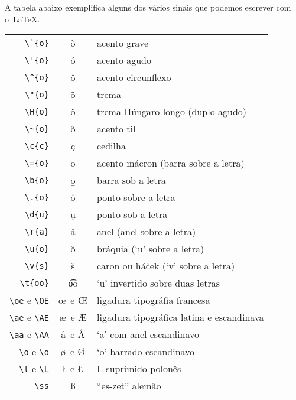 \documentclass[article,openany]{memoir}
\newenvironment{exemplo}{\begin{center}}{\end{center}}
\begin{document}
A tabela abaixo exemplifica alguns dos vários sinais que podemos
escrever com o~\LaTeX.
\begin{exemplo}
\begin{tabular}{rcl}
 \verb/\`{o}/ & \`{o} & acento grave                                   \\
 \verb/\'{o}/ & \'{o} & acento agudo                                   \\
 \verb/\^{o}/ & \^{o} & acento circunflexo                             \\
 \verb/\"{o}/ & \"{o} & trema                                          \\
 \verb/\H{o}/ & \H{o} & trema Húngaro longo (duplo agudo)              \\
 \verb/\~{o}/ & \~{o} & acento til                                     \\
 \verb/\c{c}/ & \c{c} & cedilha                                        \\
 \verb/\={o}/ & \={o} & acento mácron (barra sobre a letra)            \\
 \verb/\b{o}/ & \b{o} & barra sob a letra                              \\
 \verb/\.{o}/ & \.{o} & ponto sobre a letra                            \\
 \verb/\d{u}/ & \d{u} & ponto sob a letra                              \\
 \verb/\r{a}/ & \r{a} & anel (anel sobre a letra)                      \\
 \verb/\u{o}/ & \u{o} & bráquia (`u' sobre a letra)                    \\
 \verb/\v{s}/ & \v{s} & caron ou há\v cek (`v' sobre a letra)          \\
 \verb/\t{oo}/ 
              & \t{oo}     & `u' invertido sobre duas letras           \\
\verb/\oe/ e \verb/\OE/ 
              & \oe\ e \OE & ligadura tipográfia francesa              \\
\verb/\ae/ e \verb/\AE/
              & \ae\ e \AE & ligadura tipográfica latina e escandinava \\
\verb/\aa/ e \verb/\AA/ 
              & \aa\ e \AA & `a' com anel escandinavo                  \\
\verb/\o/ e \verb/\o/ 
              & \o\ e \O   & `o' barrado escandinavo                   \\
\verb/\l/ e \verb/\L/ 
              & \l\ e \L   & L-suprimido polonês                       \\
\verb/\ss/ & \ss           & ``es-zet'' alemão
\end{tabular}
\end{exemplo}
\end{document}
